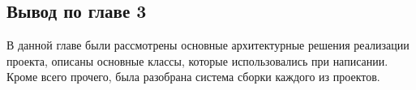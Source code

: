\documentclass[14pt,a4paper]{scrartcl}
\begin{document}
    
    
    

    \subsection{Вывод по главе 3}\label{subsec:3-conclusion}\indent

    В данной главе были рассмотрены основные архитектурные решения реализации проекта, описаны основные классы, которые использовались при написании.
    Кроме всего прочего, была разобрана система сборки каждого из проектов.

    

    
\end{document}
